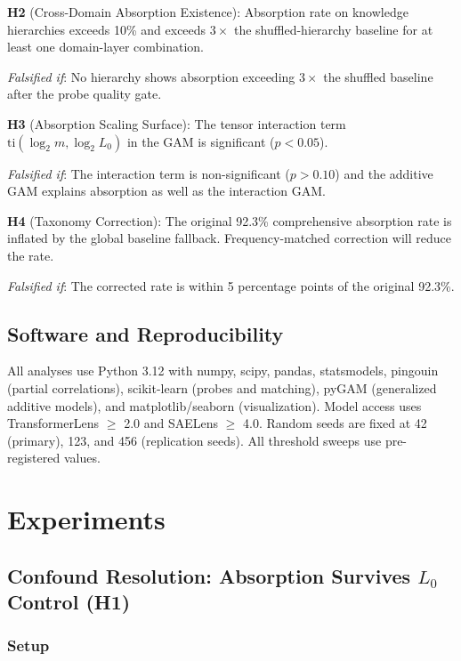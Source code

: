 \documentclass{article}
\begin{document}
\textbf{H2} (Cross-Domain Absorption Existence): Absorption rate on knowledge hierarchies exceeds 10\% and exceeds $3\times$ the shuffled-hierarchy baseline for at least one domain-layer combination.

\emph{Falsified if}: No hierarchy shows absorption exceeding $3\times$ the shuffled baseline after the probe quality gate.

\textbf{H3} (Absorption Scaling Surface): The tensor interaction term $\text{ti}(\log_2 m, \log_2 L_0)$ in the GAM is significant ($p < 0.05$).

\emph{Falsified if}: The interaction term is non-significant ($p > 0.10$) and the additive GAM explains absorption as well as the interaction GAM.

\textbf{H4} (Taxonomy Correction): The original 92.3\% comprehensive absorption rate is inflated by the global baseline fallback.
Frequency-matched correction will reduce the rate.

\emph{Falsified if}: The corrected rate is within 5 percentage points of the original 92.3\%.

\subsection{Software and Reproducibility}

All analyses use Python 3.12 with numpy, scipy, pandas, statsmodels, pingouin (partial correlations), scikit-learn (probes and matching), pyGAM (generalized additive models), and matplotlib/seaborn (visualization).
Model access uses TransformerLens $\geq$ 2.0 and SAELens $\geq$ 4.0.
Random seeds are fixed at 42 (primary), 123, and 456 (replication seeds).
All threshold sweeps use pre-registered values.

\section{Experiments}
\label{sec:experiments}

\subsection{Confound Resolution: Absorption Survives $L_0$ Control (H1)}

\subsubsection{Setup}
\end{document}
